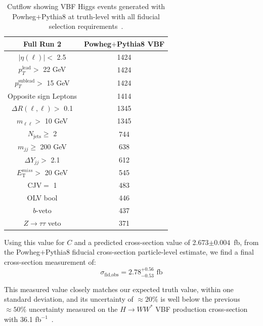 \begin{table}[!ht]
\centering
\begin{tabular}{c||c}
\textbf{Full Run 2} & \textbf{Powheg$+$Pythia8 VBF} \\
\hline
$|\eta(\ell)|<$ 2.5 & 1424 \\
$p_T^{\text{lead}}>$ 22 GeV &1424 \\
$p_T^{\text{sublead}}>$ 15 GeV & 1424\\
Opposite sign Leptons & 1414 \\
$\Delta R(\ell,\ell) >$ 0.1 & 1345 \\
$m_{\ell\ell}>$ 10 GeV & 1345  \\
$N_{\text{jets}}\geq$ 2 & 744\\
$m_{jj} \geq $ 200 GeV & 638  \\
$\Delta Y_{jj}>$ 2.1 & 612  \\
$E_{\text{T}}^{miss}>$ 20 GeV & 545  \\
CJV$=$ 1 & 483 \\
OLV bool & 446  \\
$b$-veto & 437  \\
$Z\rightarrow\tau\tau$ veto & 371 \\
\hline
\end{tabular}
\caption{Cutflow showing VBF Higgs events generated with Powheg$+$Pythia8 at truth-level with all fiducial selection requirements~\cite{ourSupportNote}. }
\label{tab:truth}
\end{table}

Using this value for $C$ and a predicted cross-section value of 2.673$\pm 0.004$~fb, from the Powheg$+$Pythia8 fiducial cross-section particle-level estimate, we find a final cross-section measurement of:
\begin{equation}
\sigma_{\text{fid,obs}} = 2.78^{+0.56}_{-0.53} \text{ fb} 
\end{equation}

This measured value closely matches our expected truth value, within one standard deviation, and its uncertainty of $\approx20\%$ is well below the previous $\approx50\%$ uncertainty measured on the $H\rightarrow WW^*$ VBF production cross-section with 36.1 fb$^{-1}$~\cite{Aaboud_2019}. 

